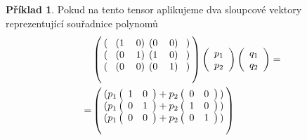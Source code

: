 \documentclass[a5paper,12pt]{amsbook}
\theoremstyle{definition}
\newtheorem{example}{Příklad}[chapter]
\begin{document}
\begin{example}
Pokud na tento tensor aplikujeme dva sloupcové vektory reprezentující souřadnice polynomů
\begin{equation*}
\begin{split}
& \left(\begin{blockarray}{cccccc}
\begin{block}{(c(cc)(cc)c)}
& 1 & 0 & 0 & 0 &\\
\end{block}
\begin{block}{(c(cc)(cc)c)}
& 0 & 1 & 1 & 0 & \\
\end{block}
\begin{block}{(c(cc)(cc)c)}
& 0 & 0 & 0 & 1 &\\
\end{block}
\end{blockarray}\right)
\left(\begin{array}{c}p_1 \\ p_2\end{array}\right)
\left(\begin{array}{c}q_1 \\ q_2\end{array}\right)= \\ = &
\left(\begin{blockarray}{c}
\begin{block}{(c)}
p_1\left(\begin{array}{cc}1 & 0\end{array}\right) + p_2\left(\begin{array}{cc}0 & 0\end{array}\right) \\
\end{block}
\begin{block}{(c)}
p_1\left(\begin{array}{cc}0 & 1\end{array}\right) + p_2\left(\begin{array}{cc}1 & 0\end{array}\right) \\
\end{block}
\begin{block}{(c)}
p_1\left(\begin{array}{cc}0 & 0\end{array}\right) + p_2\left(\begin{array}{cc}0 & 1\end{array}\right) \\
\end{block}
\end{blockarray}\right)

\end{split}
\end{equation*}
\end{example}
\end{document}
